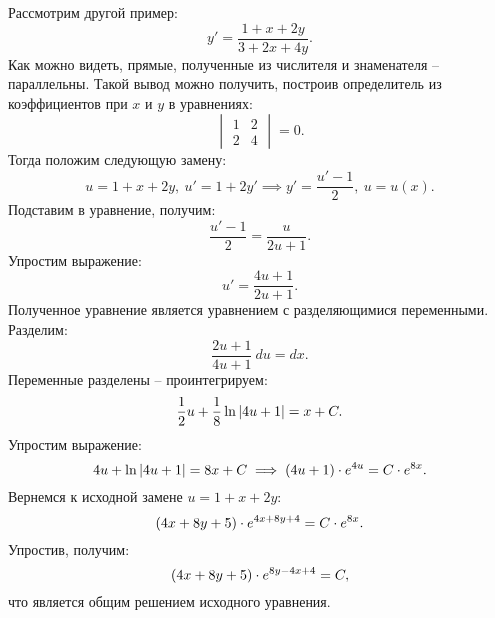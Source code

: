 		Рассмотрим другой пример:
		\[ y' = \frac{1 + x + 2y}{3 + 2x + 4y}. \]
		Как можно видеть, прямые, полученные из числителя и знаменателя -- параллельны. Такой вывод можно получить, построив определитель из коэффициентов при $x$ и $y$ в уравнениях:
		\[ \begin{vmatrix} 1 & 2 \\ 2 & 4 \end{vmatrix} = 0. \]
		Тогда положим следующую замену:
		\[ u = 1 + x + 2y, ~ u' = 1 + 2y' \implies y' = \frac{u' - 1}{2}, ~ u = u(x). \]
		Подставим в уравнение, получим:
		\[ \frac{u' - 1}{2} = \frac{u}{2u + 1}. \]
		Упростим выражение:
		\[ u' = \frac{4u + 1}{2u + 1}. \]
		Полученное уравнение является уравнением с разделяющимися переменными. Разделим:
		\[ \frac{2u + 1}{4u + 1} ~ du = dx. \]
		Переменные разделены -- проинтегрируем:
		\[ \frac{1}{2} u + \frac{1}{8} \ln \left\vert 4u + 1 \right\vert = x + C. \]
		Упростим выражение:
		\[ 4u + \ln\left\vert 4u + 1 \right\vert = 8x + C \implies \left( 4u + 1 \right) \cdot e^{4u} = C \cdot e^{8x}. \]
		Вернемся к исходной замене $u = 1 + x + 2y$:
		\[ \left( 4x + 8y + 5 \right) \cdot e^{4x + 8y + 4} = C \cdot e^{8x}. \]
		Упростив, получим:
		\[ \left( 4x + 8y + 5 \right) \cdot e^{8y - 4x + 4} = C, \]
		что является общим решением исходного уравнения.

